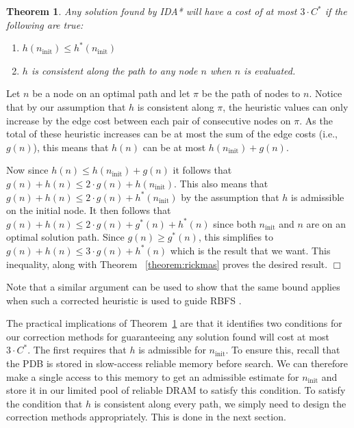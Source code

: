 \documentclass[letterpaper]{article}
\newtheorem{theorem}{Theorem}
\newenvironment{proof}{\par\noindent{\em Proof.}}{\hfill $\Box$\medskip}
\begin{document}
\begin{theorem}
Any solution found by IDA* will have a cost of at most $3 \cdot C^*$ if the following are true:
\begin{enumerate}
\item $h(n_{\mathrm{init}}) \leq h^*(n_{\mathrm{init}})$
\item $h$ is consistent along the path to any node $n$ when $n$ is evaluated.
\end{enumerate}
\label{the:h_increase_policy}
\end{theorem}
\begin{proof}
Let $n$ be a node on an optimal path %
and let $\pi$ be the path of nodes to $n$.
Notice that by our assumption that $h$ is consistent along $\pi$, the heuristic values can only increase by the edge cost between each pair of consecutive nodes on $\pi$.
As the total of these heuristic increases can be at most the sum of the edge costs (i.e., $g(n)$), this means that $h(n)$ can be at most $h(n_{\mathrm{init}}) + g(n)$.

Now since $h(n) \leq h(n_{\mathrm{init}}) + g(n)$ it follows that $g(n) + h(n) \leq 2 \cdot g(n) + h(n_{\mathrm{init}})$. This also means that $g(n) + h(n) \leq 2 \cdot g(n) + h^*(n_{\mathrm{init}})$ by the assumption that $h$ is admissible on the initial node.
It then follows that $g(n) + h(n) \leq 2 \cdot g(n) + g^*(n) + h^*(n)$ since
both $n_{\mathrm{init}}$ and $n$ are on an optimal solution path.
Since $g(n) \geq g^*(n)$, this simplifies to $g(n) + h(n) \leq 3 \cdot g(n) + h^*(n)$ which is the result that we want. This inequality, along with Theorem
~\ref{theorem:rickmas}
proves the desired result.
\end{proof}

Note that a similar argument can be used to show that the same bound applies when such a corrected heuristic is used to guide RBFS \cite{Korf1992}.





The practical implications of Theorem~\ref{the:h_increase_policy} are that it identifies two conditions for our correction methods for guaranteeing any solution found will cost at most $3 \cdot C^*$. The first requires that $h$ is admissible for $n_{\mathrm{init}}$. To ensure this, recall that the PDB is stored in slow-access reliable memory before search.
We can therefore make a single access to this memory to get an admissible estimate for $n_{\mathrm{init}}$ and store it in our limited pool of reliable DRAM to satisfy this condition.
To satisfy the condition that $h$ is consistent along every path, we simply need to design the correction methods appropriately. This is done in the next section.
\end{document}
